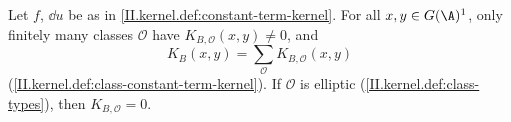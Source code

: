 Let $f$, $\dd u$ be as in \cref{II.kernel.def:constant-term-kernel}. For all $x,y\in G(\A)^1$, only finitely many classes $\mathcal O$ have
$K_{B,\mathcal O}(x,y)\neq0$, and
\[
  K_B(x,y)=\sum_{\mathcal O}K_{B,\mathcal O}(x,y)
\]
(\cref{II.kernel.def:class-constant-term-kernel}). If $\mathcal O$ is elliptic (\cref{II.kernel.def:class-types}), then $K_{B,\mathcal O}=0$.

